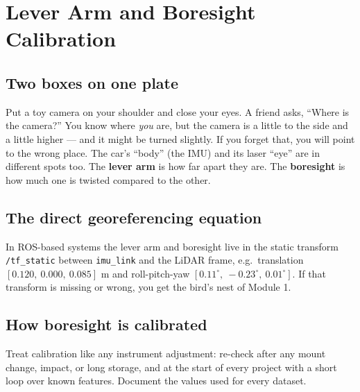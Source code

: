 \chapter{Lever Arm and Boresight Calibration}

\section{Two boxes on one plate}

\begin{kid}
Put a toy camera on your shoulder and close your eyes. A friend asks, ``Where is the camera?'' You know where \emph{you} are, but the camera is a little to the side and a little higher --- and it might be turned slightly. If you forget that, you will point to the wrong place. The car's ``body'' (the IMU) and its laser ``eye'' are in different spots too. The \textbf{lever arm} is how far apart they are. The \textbf{boresight} is how much one is twisted compared to the other.
\end{kid}


\section{The direct georeferencing equation}


\begin{tip}
In ROS-based systems the lever arm and boresight live in the static transform \texttt{/tf\_static} between \texttt{imu\_link} and the LiDAR frame, e.g.\ translation $[0.120,\ 0.000,\ 0.085]$ m and roll-pitch-yaw $[0.11^\circ,\ -0.23^\circ,\ 0.01^\circ]$. If that transform is missing or wrong, you get the bird's nest of Module 1.
\end{tip}

\section{How boresight is calibrated}


\begin{tip}
Treat calibration like any instrument adjustment: re-check after any mount change, impact, or long storage, and at the start of every project with a short loop over known features. Document the values used for every dataset.
\end{tip}
